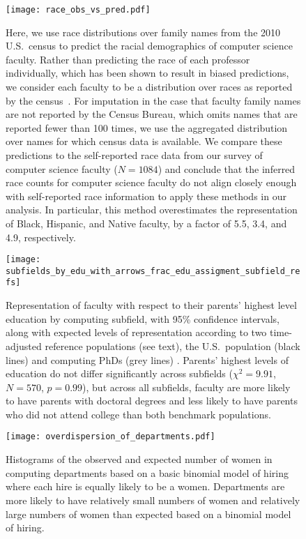 \documentclass[reprint, twocolumn, aps, nofootinbib, superscriptaddress, longbibliography]{revtex4-1}
\begin{document}
\begin{figure}[h] 
\texttt{[image: race\_obs\_vs\_pred.pdf]} 
\caption{Here, we use race distributions over family names from the 2010 U.S.~census \cite{census2016decennial} to predict the racial demographics of computer science faculty. Rather than predicting the race of each professor individually, which has been shown to result in biased predictions, we consider each faculty to be a distribution over races as reported by the census~\cite{kozlowski2021avoiding}. For imputation in the case that faculty family names are not reported by the Census Bureau, which omits names that are reported fewer than 100 times, we use the aggregated distribution over names for which census data is available. We compare these predictions to the self-reported race data from our survey of computer science faculty ($N = 1084$) and conclude that the inferred race counts for computer science faculty do not align closely enough with self-reported race information to apply these methods in our analysis. In particular, this method overestimates the representation of Black, Hispanic, and Native faculty, by a factor of 5.5, 3.4, and 4.9, respectively.} 
\label{fig:race_obs_vs_pred} 
\end{figure} 


\begin{figure*}[h] 
\texttt{[image: subfields\_by\_edu\_with\_arrows\_frac\_edu\_assigment\_subfield\_refs]} 
\caption{Representation of faculty with respect to their parents' highest level education by computing subfield, with 95\% confidence intervals, along with expected levels of representation according to two time-adjusted reference populations (see text), the U.S.~population (black lines) and computing PhDs (grey lines) \cite{census1993population, sed2020national}. Parents' highest levels of education do not differ significantly across subfields ($\chi^2 = 9.91$, $N = 570$, $p = 0.99$), but across all subfields, faculty are more likely to have parents with doctoral degrees and less likely to have parents who did not attend college than both benchmark populations.}\label{fig:parents_edu} 
\end{figure*} 

\begin{figure}[] 
\texttt{[image: overdispersion\_of\_departments.pdf]} 
\caption{Histograms of the observed and expected number of women in computing departments based on a basic binomial model of hiring where each hire is equally likely to be a women. Departments are more likely to have relatively small numbers of women and relatively large numbers of women than expected based on a binomial model of hiring.}\label{fig:overdisperson} 
\end{figure} 
\end{document}
